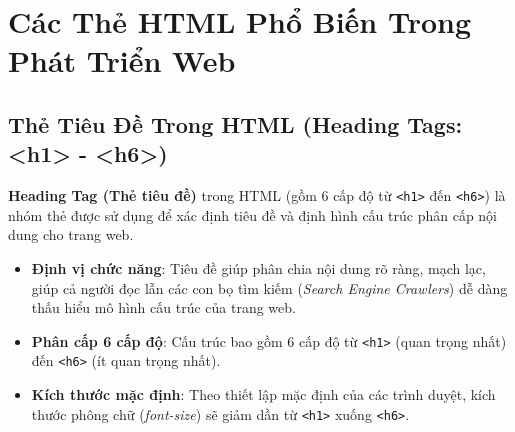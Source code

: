 \documentclass[11pt,oneside]{book}
\newcommand{\thd}[1]{\textcolor{white}{\textbf{\strut #1}}}
\newcommand{\codeinline}[1]{\textcolor{accentOrange}{\texttt{#1}}}
\newcommand{\term}[1]{\textbf{\textcolor{primaryBlue}{#1}}}
\begin{document}
\begin{prettyTableBox}
\end{prettyTableBox}

\section{Các Thẻ HTML Phổ Biến Trong Phát Triển Web}
\label{sec:common_html_tags}

\subsection{Thẻ Tiêu Đề Trong HTML (Heading Tags: <h1> - <h6>)}
\label{subsec:heading_tags}

\term{Heading Tag (Thẻ tiêu đề)} trong HTML (gồm 6 cấp độ từ \codeinline{<h1>} đến \codeinline{<h6>}) là nhóm thẻ được sử dụng để xác định tiêu đề và định hình cấu trúc phân cấp nội dung cho trang web.

\begin{itemize}[leftmargin=1.8em, itemsep=4pt, parsep=0pt]
    \item \textbf{Định vị chức năng}: Tiêu đề giúp phân chia nội dung rõ ràng, mạch lạc, giúp cả người đọc lẫn các con bọ tìm kiếm (\textit{Search Engine Crawlers}) dễ dàng thấu hiểu mô hình cấu trúc của trang web.
    \item \textbf{Phân cấp 6 cấp độ}: Cấu trúc bao gồm 6 cấp độ từ \codeinline{<h1>} (quan trọng nhất) đến \codeinline{<h6>} (ít quan trọng nhất).
    \item \textbf{Kích thước mặc định}: Theo thiết lập mặc định của các trình duyệt, kích thước phông chữ (\textit{font-size}) sẽ giảm dần từ \codeinline{<h1>} xuống \codeinline{<h6>}.
\end{itemize}
\end{document}
